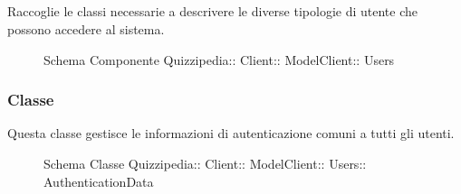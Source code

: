 \subsection{}
Raccoglie le classi necessarie a descrivere le diverse tipologie di utente che possono accedere al sistema.
\begin{figure}[H]
\centering
\noindent{}
\caption[Schema Componente Quizzipedia::Client::ModelClient::Users]{Schema Componente Quizzipedia:: Client:: ModelClient:: Users}
\end{figure}
\subsubsection{Classe }
Questa classe gestisce le informazioni di autenticazione comuni a tutti gli utenti.
\begin{figure}[H]
\centering
\noindent{}
\caption[Schema Classe AuthenticationData]{Schema Classe Quizzipedia:: Client:: ModelClient:: Users:: AuthenticationData}
\end{figure}
